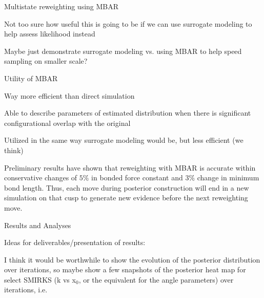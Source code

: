 \documentclass{report}
\begin{document}
\begin{outline}
\begin{outline}
\begin{outline}
\begin{outline}
\begin{outline}
        \end{outline}
      \end{outline}
      \item{Multistate reweighting using MBAR}
      \begin{outline}
        \item{Not too sure how useful this is going to be if we can use surrogate modeling to help assess likelihood instead}
        \item{Maybe just demonstrate surrogate modeling vs. using MBAR to help speed sampling on smaller scale?}
        \item{Utility of MBAR}
        \begin{outline}
          \item{Way more efficient than direct simulation}
          \item{Able to describe parameters of estimated distribution when there is significant configurational overlap with the original}
        \end{outline}
        \item{Utilized in the same way surrogate modeling would be, but less efficient (we think)}
        \item{Preliminary results have shown that reweighting with MBAR is accurate within conservative changes of $5\%$ in bonded force constant and $3\%$
                change in minimum bond length. Thus, each move during posterior construction will end in a new simulation on that cusp to generate new 
                evidence before the next reweighting move.}
      \end{outline}
    \end{outline}
  \end{outline}
  \item{Results and Analyses}
  \begin{outline}
    \item{Ideas for deliverables/presentation of results:}
    \begin{outline}
      \item{I think it would be worthwhile to show the evolution of the posterior distribution over iterations, so maybe show a few snapshots of 
                the posterior heat map for select SMIRKS (k vs x$_0$, or the equivalent for the angle parameters) over iterations, i.e.  
      \begin{figure}[h!]
      \centering
  

\end{figure}}
\end{outline}
\end{outline}
\end{outline}
\end{document}
